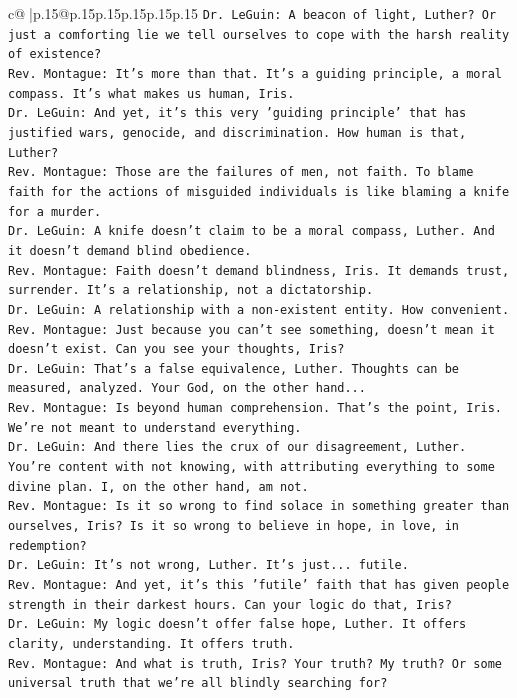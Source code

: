 \documentclass{article}
\begin{document}
{\begin{supertabular}{c@{$\;$}|p{.15\linewidth}@{}p{.15\linewidth}p{.15\linewidth}p{.15\linewidth}p{.15\linewidth}p{.15\linewidth}}
{{{\texttt{Dr. LeGuin: A beacon of light, Luther? Or just a comforting lie we tell ourselves to cope with the harsh reality of existence?} \\
\texttt{Rev. Montague: It's more than that. It's a guiding principle, a moral compass. It's what makes us human, Iris.} \\
\texttt{Dr. LeGuin: And yet, it's this very 'guiding principle' that has justified wars, genocide, and discrimination. How human is that, Luther?} \\
\texttt{Rev. Montague: Those are the failures of men, not faith. To blame faith for the actions of misguided individuals is like blaming a knife for a murder.} \\
\texttt{Dr. LeGuin: A knife doesn't claim to be a moral compass, Luther. And it doesn't demand blind obedience.} \\
\texttt{Rev. Montague: Faith doesn't demand blindness, Iris. It demands trust, surrender. It's a relationship, not a dictatorship.} \\
\texttt{Dr. LeGuin: A relationship with a non{-}existent entity. How convenient. } \\
\texttt{Rev. Montague: Just because you can't see something, doesn't mean it doesn't exist. Can you see your thoughts, Iris?} \\
\texttt{Dr. LeGuin: That's a false equivalence, Luther. Thoughts can be measured, analyzed. Your God, on the other hand...} \\
\texttt{Rev. Montague: Is beyond human comprehension. That's the point, Iris. We're not meant to understand everything.} \\
\texttt{Dr. LeGuin: And there lies the crux of our disagreement, Luther. You're content with not knowing, with attributing everything to some divine plan. I, on the other hand, am not. } \\
\texttt{Rev. Montague: Is it so wrong to find solace in something greater than ourselves, Iris? Is it so wrong to believe in hope, in love, in redemption?} \\
\texttt{Dr. LeGuin: It's not wrong, Luther. It's just... futile. } \\
\texttt{Rev. Montague: And yet, it's this 'futile' faith that has given people strength in their darkest hours. Can your logic do that, Iris?} \\
\texttt{Dr. LeGuin: My logic doesn't offer false hope, Luther. It offers clarity, understanding. It offers truth.} \\
\texttt{Rev. Montague: And what is truth, Iris? Your truth? My truth? Or some universal truth that we're all blindly searching for?} \\
}}}
\end{supertabular}}
\end{document}
